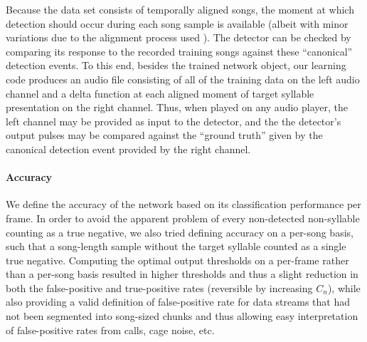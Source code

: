 \documentclass[10pt,letterpaper]{article}
\let\oldmarginpar\marginpar
\renewcommand{\marginpar}[1]{\oldmarginpar{\linespread{1}\scriptsize{#1}}}
\renewcommand{\subsubsection}[1]{\paragraph{#1}}
\begin{document}
Because the data set consists of temporally aligned songs, the moment
at which detection should occur during each song sample is available
(albeit with minor variations due to the alignment process used
\cite{Poole2012}).  The detector can be checked by comparing its
response to the recorded training songs against these ``canonical''
detection events.  To this end, besides the trained network object,
our learning code produces an audio file consisting of all of the
training data on the left audio channel and a delta function at each
aligned moment of target syllable presentation on the right
channel. Thus, when played on any audio player, the left channel may
be provided as input to the detector, and the the detector's output
pulses may be compared against the ``ground truth'' given by the
canonical detection event provided by the right channel.


\subsubsection{Accuracy}
\label{sec:accuracy}


We define the accuracy of the network based on its classification
performance per frame. In order to avoid the apparent problem of every
non-detected non-syllable counting as a true negative, we also tried
defining accuracy on a per-song basis, such that a song-length sample without the
target syllable counted as a single true negative.  Computing the
optimal output thresholds on a per-frame rather than a per-song basis resulted in higher
thresholds and thus a slight reduction in both the false-positive and true-positive rates (reversible by increasing $C_n$), while also providing a valid
definition of false-positive rate for data streams that had not been
segmented into song-sized chunks and thus allowing easy interpretation
of false-positive rates from calls, cage noise, etc.



\end{document}
